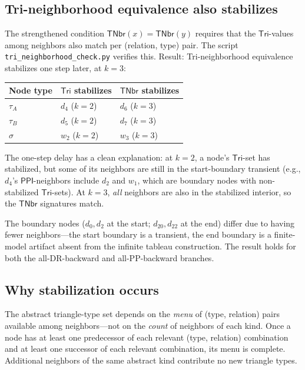 \documentclass[a4paper,11pt]{article}
\theoremstyle{definition}
\newcommand{\PPI}{\ensuremath{\mathsf{PPI}}}
\newcommand{\Tri}{\ensuremath{\mathsf{Tri}}}
\newcommand{\TNbr}{\ensuremath{\mathsf{TNbr}}}
\begin{document}
\subsection{Tri-neighborhood equivalence also stabilizes}

The strengthened condition $\TNbr(x) = \TNbr(y)$ requires
that the $\Tri$-values among neighbors also match per
(relation, type) pair.  The script
\texttt{tri\_neighborhood\_check.py} verifies this.
Result: Tri-neighborhood equivalence stabilizes one step
later, at $k = 3$:

\medskip
\begin{center}
\begin{tabular}{lll}
\toprule
Node type & $\Tri$ stabilizes & $\TNbr$ stabilizes \\
\midrule
$\tau_A$ & $d_4$ ($k{=}2$) & $d_6$ ($k{=}3$) \\
$\tau_B$ & $d_5$ ($k{=}2$) & $d_7$ ($k{=}3$) \\
$\sigma$ & $w_2$ ($k{=}2$) & $w_3$ ($k{=}3$) \\
\bottomrule
\end{tabular}
\end{center}

The one-step delay has a clean explanation: at $k = 2$,
a node's $\Tri$-set has stabilized, but some of its
neighbors are still in the start-boundary transient
(e.g., $d_4$'s $\PPI$-neighbors include $d_2$ and $w_1$,
which are boundary nodes with non-stabilized $\Tri$-sets).
At $k = 3$, \emph{all} neighbors are also in the stabilized
interior, so the $\TNbr$ signatures match.

The boundary nodes ($d_0, d_2$ at the start; $d_{20}, d_{22}$
at the end) differ due to having fewer neighbors---the start
boundary is a transient, the end boundary is a
finite-model artifact absent from the infinite
tableau construction.  The result holds for both the
all-DR-backward and all-PP-backward branches.

\subsection{Why stabilization occurs}

The abstract triangle-type set depends on the \emph{menu}
of (type, relation) pairs available among neighbors---not
on the \emph{count} of neighbors of each kind.  Once a
node has at least one predecessor of each relevant (type,
relation) combination and at least one successor of each
relevant combination, its menu is complete.  Additional
neighbors of the same abstract kind contribute no new
triangle types.
\end{document}

